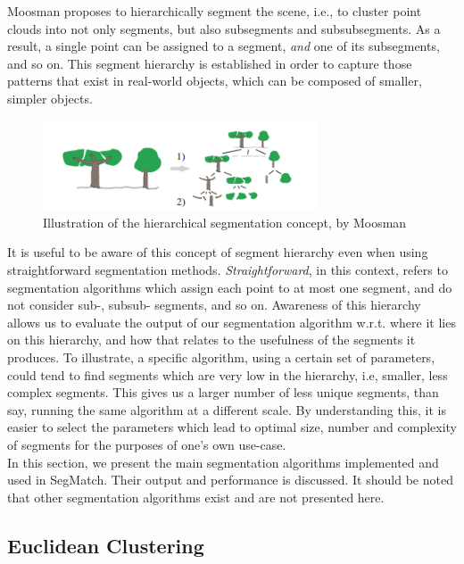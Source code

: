 Moosman \cite{moosmann2011unsupervised} proposes to hierarchically segment the scene, i.e., to cluster point clouds into not only segments, but also subsegments and subsubsegments. As a result, a single point can be assigned to a segment, \textit{and} one of its subsegments, and so on. This segment hierarchy is established in order to capture those patterns that exist in real-world objects, which can be composed of smaller, simpler objects.\\

\begin{figure}
  \centering
  \includegraphics[width=3.2in]{images/hierarchical.png}
  \caption{Illustration of the hierarchical segmentation concept, by Moosman \cite{moosmann2011unsupervised}}
  \label{fig:hierarchical}
\end{figure}

It is useful to be aware of this concept of segment hierarchy even when using straightforward segmentation methods. \textit{Straightforward}, in this context, refers to segmentation algorithms which assign each point to at most one segment, and do not consider sub-, subsub- segments, and so on. Awareness of this hierarchy allows us to evaluate the output of our segmentation algorithm w.r.t. where it lies on this hierarchy, and how that relates to the usefulness of the segments it produces. To illustrate, a specific algorithm, using a certain set of parameters, could tend to find segments which are very low in the hierarchy, i.e, smaller, less complex segments. This gives us a larger number of less unique segments, than say, running the same algorithm at a different scale.  
By understanding this, it is easier to select the parameters which lead to optimal size, number and complexity of segments for the purposes of one's own use-case.\\

In this section, we present the main segmentation algorithms implemented and used in SegMatch. Their output and performance is discussed.  
It should be noted that other segmentation algorithms exist and are not presented here.\\

\subsection{Euclidean Clustering}
\label{subsec:euclidean}

